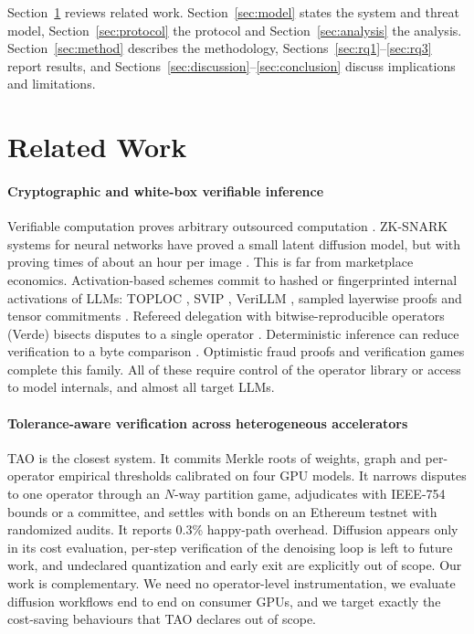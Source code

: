 \documentclass[preprint,review,12pt,authoryear]{elsarticle}
\theoremstyle{definition}
\begin{document}
Section~\ref{sec:related} reviews related work. Section~\ref{sec:model} states the system and threat model, Section~\ref{sec:protocol} the protocol and Section~\ref{sec:analysis} the analysis. Section~\ref{sec:method} describes the methodology, Sections~\ref{sec:rq1}--\ref{sec:rq3} report results, and Sections~\ref{sec:discussion}--\ref{sec:conclusion} discuss implications and limitations.

\section{Related Work}\label{sec:related}

\paragraph{Cryptographic and white-box verifiable inference}
Verifiable computation proves arbitrary outsourced computation \citep{gennaro2010vc}. ZK-SNARK systems for neural networks have proved a small latent diffusion model, but with proving times of about an hour per image \citep{chen2024zkml}. This is far from marketplace economics. Activation-based schemes commit to hashed or fingerprinted internal activations of LLMs: TOPLOC \citep{ong2025toploc}, SVIP \citep{sun2024svip}, VeriLLM \citep{wang2025verillm}, sampled layerwise proofs \citep{lim2026seal} and tensor commitments \citep{tensorcommitments2026}. Refereed delegation with bitwise-reproducible operators (Verde) bisects disputes to a single operator \citep{arun2025verde}. Deterministic inference can reduce verification to a byte comparison \citep{alves2026eigenai}. Optimistic fraud proofs and verification games \citep{conway2024opml,teutsch2019truebit} complete this family. All of these require control of the operator library or access to model internals, and almost all target LLMs.

\paragraph{Tolerance-aware verification across heterogeneous accelerators}
TAO \citep{yao2026tao} is the closest system. It commits Merkle roots of weights, graph and per-operator empirical thresholds calibrated on four GPU models. It narrows disputes to one operator through an $N$-way partition game, adjudicates with IEEE-754 bounds or a committee, and settles with bonds on an Ethereum testnet with randomized audits. It reports 0.3\% happy-path overhead. Diffusion appears only in its cost evaluation, per-step verification of the denoising loop is left to future work, and undeclared quantization and early exit are explicitly out of scope. Our work is complementary. We need no operator-level instrumentation, we evaluate diffusion workflows end to end on consumer GPUs, and we target exactly the cost-saving behaviours that TAO declares out of scope.
\end{document}
